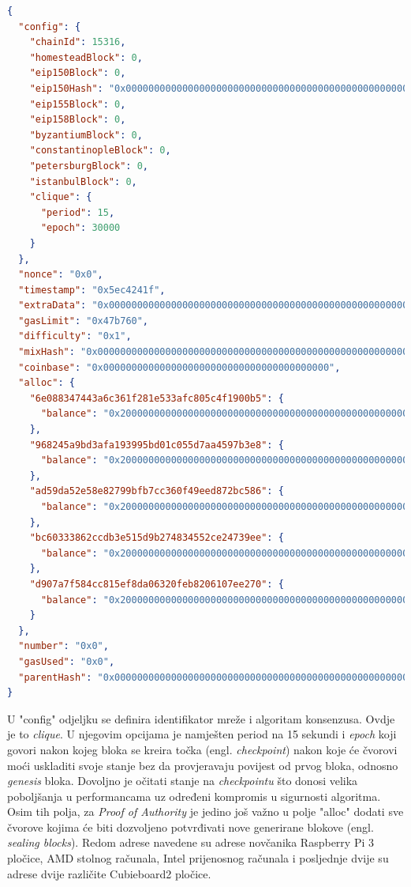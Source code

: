 \documentclass[times, utf8, zavrsni, numeric]{fer}
\begin{document}
\begin{lstlisting}[language=json,firstnumber=1]
    {
  "config": {
    "chainId": 15316,
    "homesteadBlock": 0,
    "eip150Block": 0,
    "eip150Hash": "0x0000000000000000000000000000000000000000000000000000000000000000",
    "eip155Block": 0,
    "eip158Block": 0,
    "byzantiumBlock": 0,
    "constantinopleBlock": 0,
    "petersburgBlock": 0,
    "istanbulBlock": 0,
    "clique": {
      "period": 15,
      "epoch": 30000
    }
  },
  "nonce": "0x0",
  "timestamp": "0x5ec4241f",
  "extraData": "0x00000000000000000000000000000000000000000000000000000000000000006e088347443a6c361f281e533afc805c4f1900b5968245a9bd3afa193995bd01c055d7aa4597b3e8ad59da52e58e82799bfb7cc360f49eed872bc586bc60333862ccdb3e515d9b274834552ce24739eed907a7f584cc815ef8da06320feb8206107ee2700000000000000000000000000000000000000000000000000000000000000000000000000000000000000000000000000000000000000000000000000000000000",
  "gasLimit": "0x47b760",
  "difficulty": "0x1",
  "mixHash": "0x0000000000000000000000000000000000000000000000000000000000000000",
  "coinbase": "0x0000000000000000000000000000000000000000",
  "alloc": {
    "6e088347443a6c361f281e533afc805c4f1900b5": {
      "balance": "0x200000000000000000000000000000000000000000000000000000000000000"
    },
    "968245a9bd3afa193995bd01c055d7aa4597b3e8": {
      "balance": "0x200000000000000000000000000000000000000000000000000000000000000"
    },
    "ad59da52e58e82799bfb7cc360f49eed872bc586": {
      "balance": "0x200000000000000000000000000000000000000000000000000000000000000"
    },
    "bc60333862ccdb3e515d9b274834552ce24739ee": {
      "balance": "0x200000000000000000000000000000000000000000000000000000000000000"
    },
    "d907a7f584cc815ef8da06320feb8206107ee270": {
      "balance": "0x200000000000000000000000000000000000000000000000000000000000000"
    }
  },
  "number": "0x0",
  "gasUsed": "0x0",
  "parentHash": "0x0000000000000000000000000000000000000000000000000000000000000000"
}
\end{lstlisting}

U "config" odjeljku se definira identifikator mreže i algoritam konsenzusa. Ovdje je to \emph{clique}. U njegovim opcijama je namješten
period na 15 sekundi i \emph{epoch} koji govori nakon kojeg bloka se kreira točka (engl. \emph{checkpoint}) nakon koje će čvorovi moći
uskladiti svoje stanje bez da provjeravaju povijest od prvog bloka, odnosno \emph{genesis} bloka.\citep{genesisSpec} Dovoljno je očitati stanje na \emph{checkpointu}
što donosi velika poboljšanja u performancama uz određeni kompromis u sigurnosti algoritma. \\
Osim tih polja, za \emph{Proof of Authority} je jedino još važno u polje "alloc" dodati sve čvorove kojima će biti dozvoljeno potvrđivati
nove generirane blokove (engl. \emph{sealing blocks}). Redom adrese navedene su adrese novčanika Raspberry Pi 3 pločice, AMD stolnog računala, Intel prijenosnog
računala i posljednje dvije su adrese dvije različite Cubieboard2 pločice. 
\end{document}

